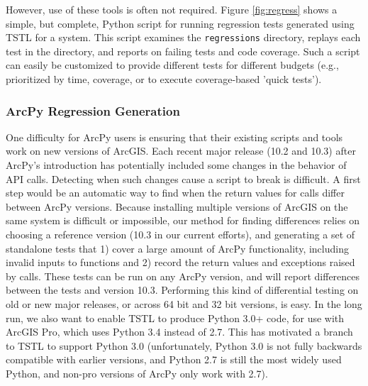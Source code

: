 However, use of these tools is often not required.  Figure \ref{fig:regress} shows a simple, but complete, Python script for running regression tests generated using TSTL for a system.  This script examines the {\tt regressions} directory, replays each test in the directory, and reports on failing tests and code coverage.  Such a script can easily be customized to provide different tests for different budgets (e.g., prioritized by time, coverage, or to execute coverage-based 'quick tests').

\subsubsection{ArcPy Regression Generation}

One difficulty for ArcPy users is ensuring that their existing scripts
and tools work on new versions of ArcGIS.  Each recent major release
(10.2 and 10.3) after ArcPy's introduction has potentially included some changes
in the behavior of API calls.  Detecting when such changes cause a
script to break is difficult.  A first step would be an automatic way
to find when the return values for calls differ between ArcPy
versions.
Because installing multiple versions of ArcGIS on the same system is
difficult or impossible, our method for finding differences relies on
choosing a reference version (10.3 in our current efforts), and
generating a set of standalone tests that 1) cover a large amount of
ArcPy functionality, including invalid inputs to functions and 2)
record the return values and exceptions raised by calls.  These tests
can be run on any ArcPy version, and will report differences between
the tests and version 10.3.  Performing this kind of differential
testing \cite{Differential} on old or new major releases, or across 64
bit and 32 bit versions, is easy.  In the long run, we also want to
enable TSTL to produce Python 3.0+ code, for use with ArcGIS Pro,
which uses Python 3.4 instead of 2.7.  This has motivated a branch to
TSTL to support Python 3.0 (unfortunately, Python 3.0 is not fully
backwards compatible with earlier versions, and Python 2.7 is still
the most widely used Python, and non-pro versions of ArcPy only work
with 2.7).


